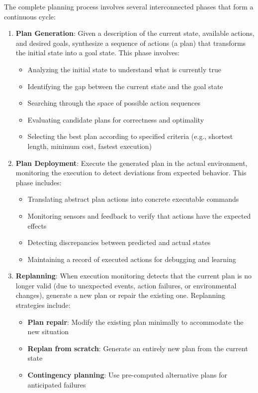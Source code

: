 \documentclass[11pt,a4paper]{article}
\theoremstyle{definition}
\theoremstyle{plain}
\theoremstyle{remark}
\begin{document}
The complete planning process involves several interconnected phases that form a continuous cycle:

\begin{enumerate}
    \item \textbf{Plan Generation}: Given a description of the current state, available actions, and desired goals, synthesize a sequence of actions (a plan) that transforms the initial state into a goal state. This phase involves:
    \begin{itemize}
        \item Analyzing the initial state to understand what is currently true
        \item Identifying the gap between the current state and the goal state
        \item Searching through the space of possible action sequences
        \item Evaluating candidate plans for correctness and optimality
        \item Selecting the best plan according to specified criteria (e.g., shortest length, minimum cost, fastest execution)
    \end{itemize}
    
    \item \textbf{Plan Deployment}: Execute the generated plan in the actual environment, monitoring the execution to detect deviations from expected behavior. This phase includes:
    \begin{itemize}
        \item Translating abstract plan actions into concrete executable commands
        \item Monitoring sensors and feedback to verify that actions have the expected effects
        \item Detecting discrepancies between predicted and actual states
        \item Maintaining a record of executed actions for debugging and learning
    \end{itemize}
    
    \item \textbf{Replanning}: When execution monitoring detects that the current plan is no longer valid (due to unexpected events, action failures, or environmental changes), generate a new plan or repair the existing one. Replanning strategies include:
    \begin{itemize}
        \item \textbf{Plan repair}: Modify the existing plan minimally to accommodate the new situation
        \item \textbf{Replan from scratch}: Generate an entirely new plan from the current state
        \item \textbf{Contingency planning}: Use pre-computed alternative plans for anticipated failures
    \end{itemize}
\end{enumerate}
\end{document}
